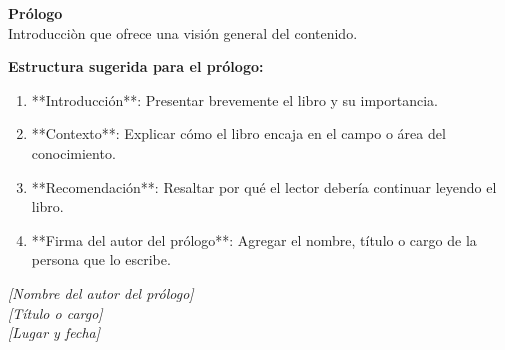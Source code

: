 \thispagestyle{empty}
\vspace*{2cm}

{\Huge \textbf{Prólogo}} \\[1.0cm]
 
Introducciòn que ofrece una visión general del contenido.

\textbf{Estructura sugerida para el prólogo:}
\begin{enumerate}
    \item **Introducción**: Presentar brevemente el libro y su importancia.
    \item **Contexto**: Explicar cómo el libro encaja en el campo o área del conocimiento.
    \item **Recomendación**: Resaltar por qué el lector debería continuar leyendo el libro.
    \item **Firma del autor del prólogo**: Agregar el nombre, título o cargo de la persona que lo escribe.
\end{enumerate}

 
\vspace{2em}
\hfill \textit{[Nombre del autor del prólogo]} \\
\hfill \textit{[Título o cargo]} \\
\hfill \textit{[Lugar y fecha]} \\
\clearpage